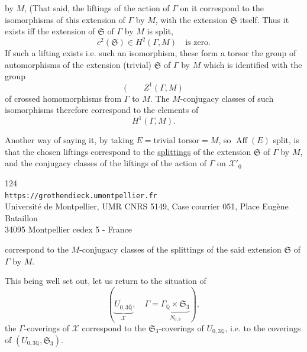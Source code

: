 by $M$,  (That said, the liftings of the action of $\Gamma$ on it correspond to the isomorphisms of this extension of $\Gamma$ by $M$, with the extension $\mathfrak S$ itself. Thus it exists iff the extension of $\mathfrak S$ of $\Gamma$ by $M$ is split,  
\[
c^2(\mathfrak S)\in H^2(\Gamma,M)\quad\text{is zero.}
\tag{282}
\]
If such a lifting exists i.e. such an isomorphism, these form a torsor  the group of automorphisms of the extension (trivial) $\mathfrak S$ of $\Gamma$ by $M$ which is identified with the group
\[
(\qquad Z^1(\Gamma,M)
\]
of crossed homomorphisms from $\Gamma$ to $M$. The $M$-conjugacy classes of such  isomorphisms therefore correspond to the elements of
\[
H^1(\Gamma,M).
\]

Another way of saying it, by taking $E={}$trivial torsor${}=M$, so $\operatorname{Aff}(E)$ split, is that the chosen liftings correspond to the \uline{splittings} of the extension $\mathfrak S$ of $\Gamma$ by $M$, and the conjugacy classes of the liftings of the action of $\Gamma$ on $\mathcal X'_0$


\begin{center}
\small
124\\
\texttt{https://grothendieck.umontpellier.fr}\\
Université de Montpellier, UMR CNRS 5149, Case courrier 051, Place Eugène Bataillon\\
34095 Montpellier cedex 5 - France
\end{center}


correspond to the $M$-conjugacy classes of the splittings of the said extension $\mathfrak S$ of $\Gamma$ by $M$.

This being well set out, let us return to the situation of
\[
\left(\underbrace{U_{0,3\overline{\mathbb Q}}}_{\mathcal X},\quad
\Gamma=\underbrace{\Gamma_{\mathbb Q}\times\mathfrak S_3}_{N_{0,3}}\right),
\]
the $\Gamma$-coverings of $\mathcal X$ correspond to the $\mathfrak S_3$-coverings of $U_{0,3\mathbb Q}$, i.e. to the coverings of $(U_{0,3\mathbb Q},\mathfrak S_3)$.



